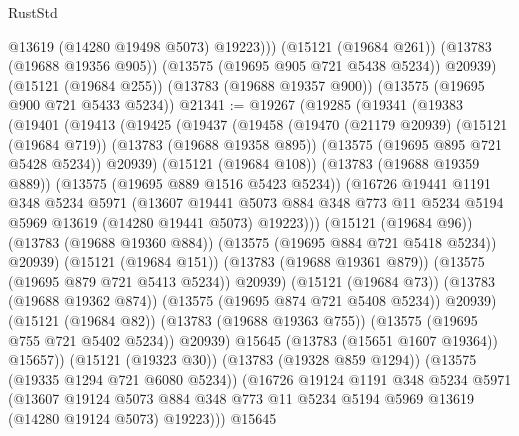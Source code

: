 \begin{lexlean}{RustStd}
\begin{coremodule}
            @13619
            (@14280 @19498 @5073)
            @19223)))
      (@15121 (@19684 @261))
      (@13783 (@19688 @19356 @905))
      (@13575 (@19695 @905 @721 @5438 @5234))
      @20939)
    (@15121 (@19684 @255))
    (@13783 (@19688 @19357 @900))
    (@13575 (@19695 @900 @721 @5433 @5234))
@21341 := @19267
    (@19285
      (@19341
        (@19383
          (@19401
            (@19413
              (@19425
                (@19437
                  (@19458
                    (@19470
                      (@21179 @20939)
                      (@15121 (@19684 @719))
                      (@13783 (@19688 @19358 @895))
                      (@13575 (@19695 @895 @721 @5428 @5234))
                      @20939)
                    (@15121 (@19684 @108))
                    (@13783 (@19688 @19359 @889))
                    (@13575 (@19695 @889 @1516 @5423 @5234))
                    (@16726
                      @19441
                      @1191
                      @348
                      @5234
                      @5971
                      (@13607
                        @19441
                        @5073
                        @884
                        @348
                        @773
                        @11
                        @5234
                        @5194
                        @5969
                        @13619
                        (@14280 @19441 @5073)
                        @19223)))
                  (@15121 (@19684 @96))
                  (@13783 (@19688 @19360 @884))
                  (@13575 (@19695 @884 @721 @5418 @5234))
                  @20939)
                (@15121 (@19684 @151))
                (@13783 (@19688 @19361 @879))
                (@13575 (@19695 @879 @721 @5413 @5234))
                @20939)
              (@15121 (@19684 @73))
              (@13783 (@19688 @19362 @874))
              (@13575 (@19695 @874 @721 @5408 @5234))
              @20939)
            (@15121 (@19684 @82))
            (@13783 (@19688 @19363 @755))
            (@13575 (@19695 @755 @721 @5402 @5234))
            @20939)
          @15645
          (@13783 (@15651 @1607 @19364))
          @15657))
      (@15121 (@19323 @30))
      (@13783 (@19328 @859 @1294))
      (@13575 (@19335 @1294 @721 @6080 @5234))
      (@16726
        @19124
        @1191
        @348
        @5234
        @5971
        (@13607
          @19124
          @5073
          @884
          @348
          @773
          @11
          @5234
          @5194
          @5969
          @13619
          (@14280 @19124 @5073)
          @19223)))
    @15645

\end{coremodule}
\end{lexlean}
